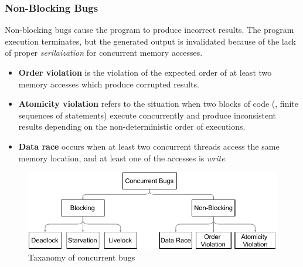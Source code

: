 \subsubsection{Non-Blocking Bugs}
Non-blocking bugs cause the program to produce incorrect results. The program execution terminates, but the generated output is invalidated because of the lack of proper \textit{serilaization} for concurrent memory accesses.
\begin{itemize}
  \item \textbf{Order violation} is the violation of the expected order of at least two memory accesses which produce corrupted results.
  \item \textbf{Atomicity violation} refers to the situation when two blocks of code (\ie, finite sequences of statements) execute concurrently and produce inconsistent results depending on the non-deterministic order of executions.
  \item \textbf{Data race} occurs when at least two concurrent threads access the same memory location, and at least one of the accesses is \textit{write}.
\end{itemize}

\begin{figure}[t]
\centering
\includegraphics[width=.9\textwidth]{dissertation_intro_bugs.pdf}
\caption{Taxanomy of concurrent bugs}
\label{fig:ch1_concBugs}
\end{figure}


